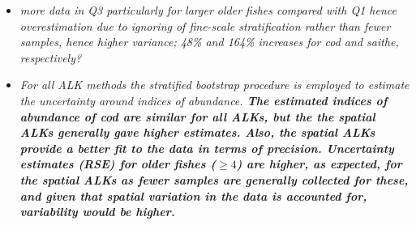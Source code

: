 \documentclass[a4paper 12pt]{article}
\numberwithin{equation}{section}
\begin{document}
\clearpage


\clearpage
\begin{itemize}

\item \emph{more data in Q3 particularly for larger older fishes compared with Q1 hence overestimation due to ignoring of fine-scale stratification rather than fewer samples, hence higher variance; 48\% and 164\% increases for cod and saithe, respectively?}

\item \emph{For all ALK methods the stratified bootstrap procedure is employed to estimate the uncertainty around indices of abundance. {\bf The estimated indices of abundance of cod are similar for all ALKs, but the the spatial ALKs generally gave higher estimates. Also, the spatial ALKs provide a better fit to the data in terms of precision. Uncertainty estimates (RSE) for older fishes ($\ge 4$) are higher, as expected, for the spatial ALKs as fewer samples are generally collected for these, and given that spatial variation in the data is accounted for, variability would be higher.}}


\end{itemize}
\end{document}
